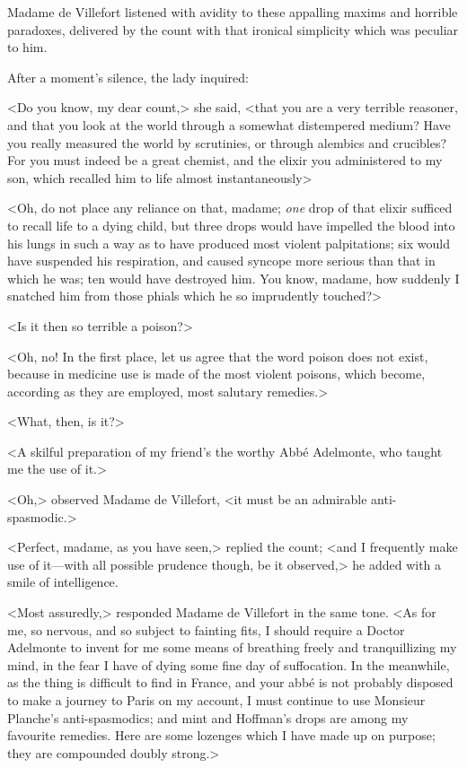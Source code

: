  Madame de Villefort listened with avidity to these appalling maxims and horrible paradoxes, delivered by the count with that ironical simplicity which was peculiar to him. 

 After a moment's silence, the lady inquired: 

 <Do you know, my dear count,> she said, <that you are a very terrible reasoner, and that you look at the world through a somewhat distempered medium? Have you really measured the world by scrutinies, or through alembics and crucibles? For you must indeed be a great chemist, and the elixir you administered to my son, which recalled him to life almost instantaneously\longdash>  
 
 <Oh, do not place any reliance on that, madame; \textit{one} drop of that elixir sufficed to recall life to a dying child, but three drops would have impelled the blood into his lungs in such a way as to have produced most violent palpitations; six would have suspended his respiration, and caused syncope more serious than that in which he was; ten would have destroyed him. You know, madame, how suddenly I snatched him from those phials which he so imprudently touched?> 

 <Is it then so terrible a poison?> 

 <Oh, no! In the first place, let us agree that the word poison does not exist, because in medicine use is made of the most violent poisons, which become, according as they are employed, most salutary remedies.> 

 <What, then, is it?> 

 <A skilful preparation of my friend's the worthy Abbé Adelmonte, who taught me the use of it.> 

 <Oh,> observed Madame de Villefort, <it must be an admirable anti-spasmodic.> 

 <Perfect, madame, as you have seen,> replied the count; <and I frequently make use of it—with all possible prudence though, be it observed,> he added with a smile of intelligence. 

 <Most assuredly,> responded Madame de Villefort in the same tone. <As for me, so nervous, and so subject to fainting fits, I should require a Doctor Adelmonte to invent for me some means of breathing freely and tranquillizing my mind, in the fear I have of dying some fine day of suffocation. In the meanwhile, as the thing is difficult to find in France, and your abbé is not probably disposed to make a journey to Paris on my account, I must continue to use Monsieur Planche's anti-spasmodics; and mint and Hoffman's drops are among my favourite remedies. Here are some lozenges which I have made up on purpose; they are compounded doubly strong.> 

